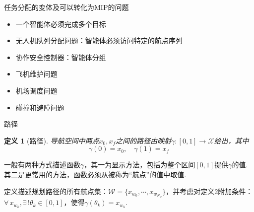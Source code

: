 \documentclass[notheorems,11pt]{beamer}
\theoremstyle{plain}
\numberwithin{theorem}{section}
\newtheorem{definition}{定义}
\numberwithin{lemma}{section}
\numberwithin{corollary}{section}
\theoremstyle{example}
\begin{document}
\begin{frame}{任务分配的变体及可以转化为MIP的问题}
  \begin{itemize}
    \item 一个智能体必须完成多个目标
    \item 无人机队列分配问题：智能体必须访问特定的航点序列
    \item 协作安全控制器：智能体分组
  \end{itemize}

  \begin{itemize}
    \item 飞机维护问题
    \item 机场调度问题
    \item 碰撞和避障问题
  \end{itemize}
\end{frame}

\begin{frame}{路径}
  \begin{definition}[路径]
    导航空间中两点$x_0,x_f$之间的路径由映射$\gamma:[0,1]\to \mathcal{X}$给出，其中
    \begin{equation}
      \gamma(0)=x_0,\quad \gamma(1)=x_f
    \end{equation}
  \end{definition}
  一般有两种方式描述函数$\gamma$，其一为显示方法，包括为整个区间$[0,1]$提供$\gamma$的值.其二是更常用的方法，函数必须从被称为“航点”的值中取值.\par
  定义描述规划路径的所有航点集：$\mathcal{W}=\{x_{w_0},\cdots,x_{w_{N_w}}\}$，并考虑对定义2附加条件：$\forall\, x_{w_k},\exists\, !\theta_k\in[0,1]$，使得$\gamma(\theta_k)=x_{w_k}$.
\end{frame}
\end{document}
